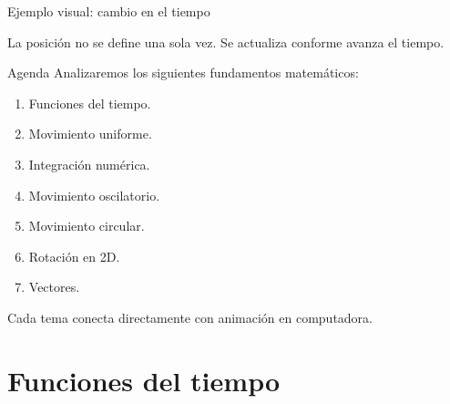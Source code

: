 \documentclass{beamer}
\begin{document}
\begin{frame}{Ejemplo visual: cambio en el tiempo}
\begin{center}
\end{center}

\medskip

La posición no se define una sola vez.  
Se actualiza conforme avanza el tiempo.
\end{frame}

\begin{frame}{Agenda}
Analizaremos los siguientes fundamentos matemáticos:

\begin{enumerate}
    \item Funciones del tiempo.
    \item Movimiento uniforme.
    \item Integración numérica.
    \item Movimiento oscilatorio.
    \item Movimiento circular.
    \item Rotación en 2D.
    \item Vectores.
\end{enumerate}

\medskip

Cada tema conecta directamente con animación en computadora.
\end{frame}

\section{Funciones del tiempo}
\end{document}
